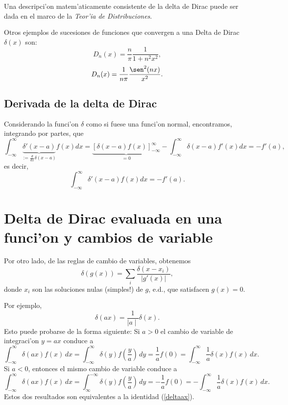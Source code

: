 Una descripci'on matem'aticamente consistente de la delta de Dirac puede ser
dada en el marco de la \textit{Teor'ia de Distribuciones}.

Otros ejemplos de sucesiones de funciones que convergen a una Delta de Dirac $\delta(x)$ son:
\begin{equation}
D_n(x)=\frac{n}{\pi}\frac{1}{1+n^2x^2},
\end{equation}
\begin{equation}
D_n(x)=\frac{1}{n\pi}\frac{\sen^2(nx)}{x^2}.
\end{equation}


\subsection{Derivada de la delta de Dirac}

Considerando la funci'on $\delta$ como si fuese una funci'on normal,
encontramos, integrando por partes, que
\begin{equation}
  \int_{-\infty}^{\infty}\underbrace{\delta'(x-a)}_{:=\frac{d}{dx}
   \delta(x-a)} f(x)d x =\underbrace{[\delta(x-a)
   f(x)]_{-\infty}^{\infty}}_{=0}
  -\int_{-\infty}^{\infty}\delta(x-a)f'(x)d x = -f'(a),
 \end{equation}
es decir,
\begin{equation}
  \int_{-\infty}^{\infty}\delta'(x-a) f(x) d x = -f'(a).
 \end{equation}

\section{Delta de Dirac evaluada en una funci'on y cambios de variable}
Por otro lado, de las reglas de cambio de variables, obtenemos
\begin{equation}
\boxed{  \delta(g(x)) = \sum_i\frac{\delta(x-x_i)}{\left|g'(x)\right|},}
 \end{equation}
 donde $x_i$ son las soluciones nulas (simples!) de $g$, e.d., que satisfacen
$g(x)=0$.

Por ejemplo,
\begin{equation}
\boxed{\delta(a x) = \frac{1}{\mid a \mid} \delta(x).}\label{deltaax}
\end{equation}
Esto puede probarse de la forma siguiente: Si $a > 0$ el cambio de variable de
integraci'on $y = a x$ conduce a
\begin{equation}
\int_{- \infty}^{\infty} \delta(a x) f(x)\,d x =
\int_{- \infty}^{\infty} \delta(y) f(\frac{y}{a})\,dy = \frac{1}{a} f(0) =
\int_{- \infty}^{\infty} \frac{1}{a} \delta(x) f(x) \,dx.
\end{equation}
Si $a < 0$, entonces el mismo cambio de variable conduce a
\begin{equation}
\int_{- \infty}^{\infty} \delta(a x) f(x)\,dx =
\int_{\infty}^{- \infty} \delta(y) f(\frac{y}{a})\,dy = - \frac{1}{a} f(0) =
- \int_{- \infty}^{\infty} \frac{1}{a} \delta(x) f(x)\,dx.
\end{equation}
Estos dos resultados son equivalentes a la identidad (\ref{deltaax}).

